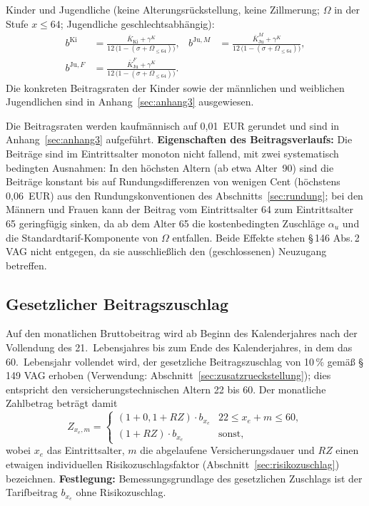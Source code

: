 Kinder und Jugendliche (keine Alterungsrückstellung, keine Zillmerung;
$\Omega$ in der Stufe $x \le 64$; Jugendliche geschlechtsabhängig):
\begin{equation}
\begin{aligned}
b^{\mathrm{Ki}} &= \frac{\bar{K}_{\mathrm{Ki}} + \gamma^{K}}
{12\,\bigl(1-(\sigma+\Omega_{\le 64})\bigr)}, &
b^{\mathrm{Ju},M} &= \frac{\bar{K}^{M}_{\mathrm{Ju}} + \gamma^{K}}
{12\,\bigl(1-(\sigma+\Omega_{\le 64})\bigr)}, \\[2pt]
b^{\mathrm{Ju},F} &= \frac{\bar{K}^{F}_{\mathrm{Ju}} + \gamma^{K}}
{12\,\bigl(1-(\sigma+\Omega_{\le 64})\bigr)}. &&
\end{aligned}
\label{eq:bkinder}
\end{equation}
Die konkreten Beitragsraten der Kinder sowie der männlichen und
weiblichen Jugendlichen sind in Anhang~\ref{sec:anhang3} ausgewiesen.

Die Beitragsraten werden kaufmännisch auf 0{,}01~EUR gerundet und sind
in Anhang~\ref{sec:anhang3} aufgeführt.
\textbf{Eigenschaften des Beitragsverlaufs:} Die Beiträge sind im
Eintrittsalter monoton nicht fallend, mit zwei systematisch bedingten
Ausnahmen: In den höchsten Altern (ab etwa Alter~90) sind die Beiträge
konstant bis auf Rundungsdifferenzen von wenigen Cent (höchstens
0{,}06~EUR) aus den Rundungskonventionen des
Abschnitts~\ref{sec:rundung}; bei den Männern und Frauen kann der
Beitrag vom Eintrittsalter 64 zum Eintrittsalter 65 geringfügig sinken,
da ab dem Alter 65 die kostenbedingten Zuschläge $\alpha_u$ und die
Standardtarif-Komponente von $\Omega$ entfallen. Beide Effekte stehen
\S\,146 Abs.\,2 VAG nicht entgegen, da sie ausschließlich den
(geschlossenen) Neuzugang betreffen.

\subsection{Gesetzlicher Beitragszuschlag}\label{sec:gz}

Auf den monatlichen Bruttobeitrag wird ab Beginn des Kalenderjahres
nach der Vollendung des 21.~Lebensjahres bis zum Ende des
Kalenderjahres, in dem das 60.~Lebensjahr vollendet wird, der
gesetzliche Beitragszuschlag von 10\,\% gemäß \S\,149 VAG erhoben
(Verwendung: Abschnitt~\ref{sec:zusatzrueckstellung}); dies entspricht
den versicherungstechnischen Altern 22 bis 60. Der monatliche
Zahlbetrag beträgt damit
\begin{equation}
Z_{x_e,m} = \begin{cases}
(1 + 0{,}1 + RZ)\cdot b_{x_e} & 22 \le x_e+m \le 60,\\[2pt]
(1 + RZ)\cdot b_{x_e} & \text{sonst},
\end{cases}
\label{eq:zahlbeitrag}
\end{equation}
wobei $x_e$ das Eintrittsalter, $m$ die abgelaufene Versicherungsdauer
und $RZ$ einen etwaigen individuellen Risikozuschlagsfaktor
(Abschnitt~\ref{sec:risikozuschlag}) bezeichnen. \textbf{Festlegung:}
Bemessungsgrundlage des gesetzlichen Zuschlags ist der Tarifbeitrag
$b_{x_e}$ ohne Risikozuschlag.

